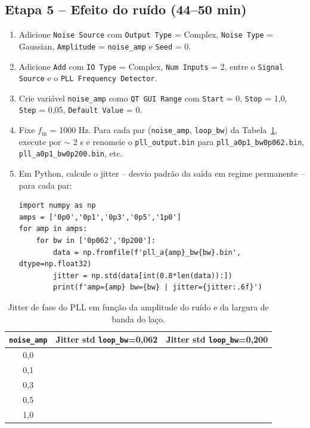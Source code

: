 \documentclass[11pt,a4paper]{article}
\begin{document}
\subsection*{Etapa 5 -- Efeito do ruído (44--50 min)}

\begin{instrucao}
\begin{enumerate}[label=\arabic*.]
  \item Adicione \texttt{Noise Source} com \texttt{Output Type} = Complex,
    \texttt{Noise Type} = Gaussian, \texttt{Amplitude} = \texttt{noise\_amp}
    e \texttt{Seed} = 0.
  \item Adicione \texttt{Add} com \texttt{IO Type} = Complex,
    \texttt{Num Inputs} = 2, entre o \texttt{Signal Source} e o
    \texttt{PLL Frequency Detector}.
  \item Crie variável \texttt{noise\_amp} como \texttt{QT GUI Range}
    com \texttt{Start} = 0, \texttt{Stop} = 1{,}0, \texttt{Step} = 0{,}05,
    \texttt{Default Value} = 0.
  \item Fixe $f_\text{in}$ = 1000 Hz. Para cada par
    (\texttt{noise\_amp}, \texttt{loop\_bw}) da Tabela~\ref{tab:ruido},
    execute por $\sim$ 2 s e renomeie o \texttt{pll\_output.bin} para
    \texttt{pll\_a0p1\_bw0p062.bin}, \texttt{pll\_a0p1\_bw0p200.bin}, etc.
  \item Em Python, calcule o jitter -- desvio padrão da saída em regime
    permanente -- para cada par:
\begin{verbatim}
import numpy as np
amps = ['0p0','0p1','0p3','0p5','1p0']
for amp in amps:
    for bw in ['0p062','0p200']:
        data = np.fromfile(f'pll_a{amp}_bw{bw}.bin', dtype=np.float32)
        jitter = np.std(data[int(0.8*len(data)):])
        print(f'amp={amp} bw={bw} | jitter={jitter:.6f}')
\end{verbatim}
\end{enumerate}
\end{instrucao}

\begin{table}[H]
  \centering
  \begin{tabular}{c c c}
    \toprule
    \texttt{noise\_amp} & Jitter std \texttt{loop\_bw}=0{,}062 & Jitter std \texttt{loop\_bw}=0{,}200 \\
    \midrule
    0{,}0 & & \\
    0{,}1 & & \\
    0{,}3 & & \\
    0{,}5 & & \\
    1{,}0 & & \\
    \bottomrule
  \end{tabular}
  \caption{Jitter de fase do PLL em função da amplitude do ruído e da largura de banda do laço.}
  \label{tab:ruido}
\end{table}
\end{document}
